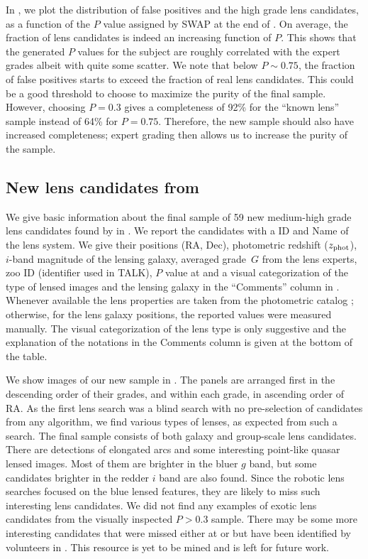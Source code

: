 \documentclass[useAMS,usenatbib,a4paper]{mn2e}
\begin{document}
In , we plot the distribution of false positives and
the high grade lens candidates, as a function of the $P$ value assigned
by SWAP at the end of \StageTwo.  On average, the fraction of lens
candidates is indeed an increasing function of $P$. This shows that the
\sw generated $P$ values for the subject are roughly correlated with the
expert grades albeit with quite some scatter.  We note that below
$P\sim0.75$, the fraction of false positives starts to exceed the
fraction of real lens candidates. This could be a good threshold to
choose to maximize the purity of the final sample. However,
choosing $P=0.3$ gives a completeness of 92\% for the ``known lens''
sample instead of 64\% for $P=0.75$. Therefore, the new sample should
also have increased completeness; expert grading then allows us to
increase the purity of the sample.


\subsection{New lens candidates from \sw}
\label{sec:results:newcand}

We give basic information about the final sample of 59 new medium-high grade
lens candidates found by \sw in
. We report the candidates with a \sw ID and Name
of the lens system. We give their positions (RA, Dec), photometric
redshift ($z_{\rm phot}$), $i$-band magnitude of the lensing galaxy,
averaged grade~$G$ from the lens experts, zoo ID (identifier used in
TALK), $P$ value at \StageTwo and a visual categorization of the type of
lensed images and the lensing galaxy in the ``Comments'' column in
. Whenever available the lens properties are
taken from the \cfhtls photometric catalog \citep{Coupon2009}; otherwise,
for the lens galaxy positions, the reported values were measured
manually. The visual categorization of the lens type is only suggestive
and the explanation of the notations in the Comments column is given at
the bottom of the table.

We show images of our new sample in . The panels are arranged
first in the descending order of their grades, and within each grade, in
ascending order
of RA. As the first lens search was a blind search with no
pre-selection of candidates from any algorithm, we find various types of
lenses, as expected from such a search. The final sample consists of
both galaxy and group-scale lens candidates. There are detections of
elongated arcs and some interesting point-like quasar lensed images.
Most of them are brighter in the bluer $g$ band, but some candidates brighter
in the redder $i$ band are also found. Since the robotic lens searches
focused on the blue lensed features, they are likely to miss
such interesting lens candidates. We did not find any examples of
exotic lens candidates from the visually inspected $P>0.3$ sample.
There may be some more interesting candidates that were missed either at
\StageOne or \StageTwo but have been identified by volunteers in \Talk.
This resource is yet to be mined and is left for future work.
\end{document}
